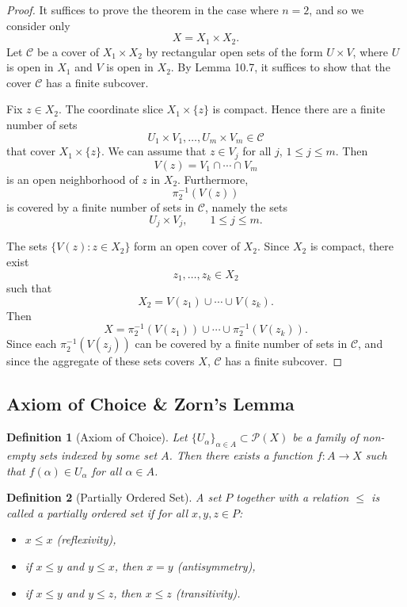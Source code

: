 \documentclass[12pt]{article}
\newtheorem{definition}{Definition}
\begin{document}
\begin{proof}
It suffices to prove the theorem in the case where $n=2$, and so we consider only
\[
X=X_1\times X_2.
\]
Let $\mathcal{C}$ be a cover of $X_1\times X_2$ by rectangular open sets of the form $U\times V$, where $U$ is open in $X_1$ and $V$ is open in $X_2$. By Lemma 10.7, it suffices to show that the cover $\mathcal{C}$ has a finite subcover.

Fix $z\in X_2$. The coordinate slice $X_1\times\{z\}$ is compact. Hence there are a finite number of sets
\[
U_1\times V_1,\dots,U_m\times V_m\in\mathcal{C}
\]
that cover $X_1\times\{z\}$. We can assume that $z\in V_j$ for all $j$, $1\le j\le m$. Then
\[
V(z)=V_1\cap\cdots\cap V_m
\]
is an open neighborhood of $z$ in $X_2$. Furthermore,
\[
\pi_2^{-1}(V(z))
\]
is covered by a finite number of sets in $\mathcal{C}$, namely the sets
\[
U_j\times V_j,\qquad 1\le j\le m.
\]

The sets $\{V(z):z\in X_2\}$ form an open cover of $X_2$. Since $X_2$ is compact, there exist
\[
z_1,\dots,z_k\in X_2
\]
such that
\[
X_2=V(z_1)\cup\cdots\cup V(z_k).
\]
Then
\[
X=\pi_2^{-1}(V(z_1))\cup\cdots\cup \pi_2^{-1}(V(z_k)).
\]
Since each $\pi_2^{-1}(V(z_j))$ can be covered by a finite number of sets in $\mathcal{C}$, and since the aggregate of these sets covers $X$, $\mathcal{C}$ has a finite subcover.
\end{proof}

\subsection*{Axiom of Choice \& Zorn's Lemma}

\begin{definition}[Axiom of Choice]
Let $\{U_\alpha\}_{\alpha \in A} \subset \mathcal{P}(X)$ be a family of non-empty sets indexed by some set $A$. Then there exists a function $f : A \to X$ such that $f(\alpha) \in U_\alpha$ for all $\alpha \in A$.
\end{definition}

\begin{definition}[Partially Ordered Set]
A set $P$ together with a relation $\leq$ is called a \emph{partially ordered set} if for all $x,y,z \in P$:
\begin{itemize}
    \item $x \leq x$ (reflexivity),
    \item if $x \leq y$ and $y \leq x$, then $x = y$ (antisymmetry),
    \item if $x \leq y$ and $y \leq z$, then $x \leq z$ (transitivity).
\end{itemize}
\end{definition}
\end{document}
